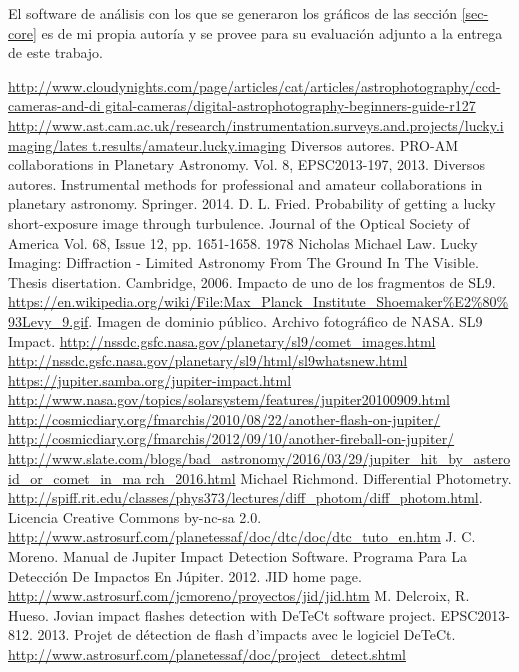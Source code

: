 \documentclass[a4paper,10pt]{article}
\begin{document}
El software de análisis con los que se generaron los gráficos de las sección 
\ref{sec-core} es de mi propia autoría y se provee para su evaluación adjunto a la 
entrega de este trabajo.

\begin{thebibliography}{99}
 \url{
http://www.cloudynights.com/page/articles/cat/articles/astrophotography/ccd-cameras-and-di
gital-cameras/digital-astrophotography-beginners-guide-r127}
 \url{
http://www.ast.cam.ac.uk/research/instrumentation.surveys.and.projects/lucky.imaging/lates
t.results/amateur.lucky.imaging}
 Diversos autores. PRO-AM collaborations in Planetary Astronomy. Vol. 8, 
EPSC2013-197, 2013.
 Diversos autores. Instrumental methods for professional and amateur 
collaborations in planetary astronomy. Springer. 2014.
 D. L. Fried. Probability of getting a lucky short-exposure image through 
turbulence. Journal of the Optical Society of America Vol. 68, Issue 12, pp. 1651-1658. 
1978
 Nicholas Michael Law. Lucky Imaging: Diffraction - Limited Astronomy From The 
Ground In The Visible. Thesis disertation. Cambridge, 2006.
Impacto de uno de los fragmentos de SL9. \url{
https://en.wikipedia.org/wiki/File:Max_Planck_Institute_Shoemaker%
Imagen de dominio público.
Archivo fotográfico de NASA. SL9 Impact.
\url{http://nssdc.gsfc.nasa.gov/planetary/sl9/comet_images.html}
\url{http://nssdc.gsfc.nasa.gov/planetary/sl9/html/sl9whatsnew.html}
\url{https://jupiter.samba.org/jupiter-impact.html}
\url{http://www.nasa.gov/topics/solarsystem/features/jupiter20100909.html}
\url{http://cosmicdiary.org/fmarchis/2010/08/22/another-flash-on-jupiter/}
\url{http://cosmicdiary.org/fmarchis/2012/09/10/another-fireball-on-jupiter/}
\url{
http://www.slate.com/blogs/bad_astronomy/2016/03/29/jupiter_hit_by_asteroid_or_comet_in_ma
rch_2016.html}
 Michael Richmond. Differential Photometry. \url{
http://spiff.rit.edu/classes/phys373/lectures/diff_photom/diff_photom.html}. 
Licencia Creative Commons by-nc-sa 2.0.
\url{http://www.astrosurf.com/planetessaf/doc/dtc/doc/dtc_tuto_en.htm}
J. C. Moreno. Manual de Jupiter Impact Detection Software. Programa Para La 
Detección De Impactos En Júpiter. 2012.
JID home page. \url{http://www.astrosurf.com/jcmoreno/proyectos/jid/jid.htm}
 M. Delcroix, R. Hueso. Jovian impact flashes detection with DeTeCt software 
project. EPSC2013-812. 2013.
 Projet de détection de flash d'impacts avec le logiciel DeTeCt.
\url{http://www.astrosurf.com/planetessaf/doc/project_detect.shtml}
\end{thebibliography}
\end{document}
